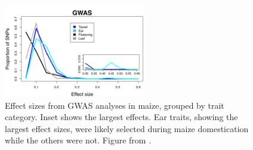 

\vspace{-0.4cm}

\begin{figure}
\centering
   \includegraphics[width=0.55\textwidth]{Figure2_Brownetal2011.png}
  \caption{Effect sizes from GWAS analyses in maize, grouped by trait category. Inset shows the largest effects. Ear traits, showing the largest effect sizes, were likely selected during maize domestication while the others were not. Figure from \citealt{Brown:2011}.}
  \label{fig:model}
\end{figure}

